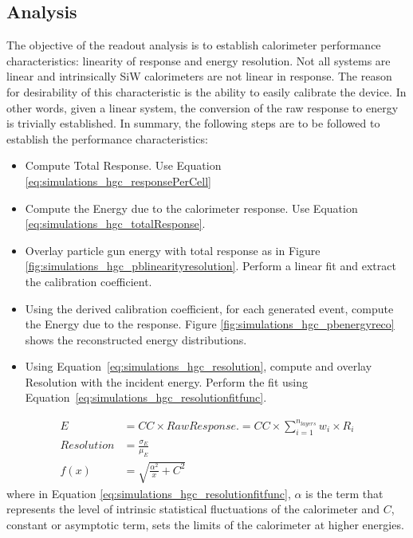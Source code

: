 \subsection{Analysis}
The objective of the readout analysis is to establish calorimeter performance characteristics: linearity of response and energy resolution. Not all systems are linear and intrinsically SiW calorimeters are not linear in response. The reason for desirability of this characteristic is the ability to easily calibrate the device. In other words, given a linear system, the conversion of the raw response to energy is trivially established. In summary, the following steps are to be followed to establish the performance characteristics:
\begin{itemize}
    \item Compute Total Response. Use Equation \ref{eq:simulations_hgc_responsePerCell}
    \item Compute the Energy due to the calorimeter response. Use Equation \ref{eq:simulations_hgc_totalResponse}.
    \item Overlay particle gun energy with total response as in Figure \ref{fig:simulations_hgc_pblinearityresolution}. Perform a linear fit and extract the calibration coefficient.
    \item Using the derived calibration coefficient, for each generated event, compute the Energy due to the response. Figure \ref{fig:simulations_hgc_pbenergyreco} shows the reconstructed energy distributions.
    \item Using Equation~\ref{eq:simulations_hgc_resolution}, compute and overlay Resolution with the incident energy. Perform the fit using Equation~\ref{eq:simulations_hgc_resolutionfitfunc}.
\end{itemize}
\begin{subequations}\label{eq:simulations_hgc_definitions}
\begin{align}
    E& = {CC} \times {Raw Response}. = {CC} \times {\sum_{i=1}^{n_{layers}} w_i \times  R_{i}}\label{eq:simulations_hgc_totalResponse}\\
    {Resolution}& = {\frac{\sigma_E}{\mu_E}}\label{eq:simulations_hgc_resolution}\\
    {f(x)}& = {\sqrt{\frac{\alpha^2}{x} + C^2}}\label{eq:simulations_hgc_resolutionfitfunc}
\end{align}
\end{subequations}
where in Equation \ref{eq:simulations_hgc_resolutionfitfunc}, $\alpha$ is the term that represents the level of intrinsic statistical fluctuations of the calorimeter and $C$, constant or asymptotic term, sets the limits of the calorimeter at higher energies.

